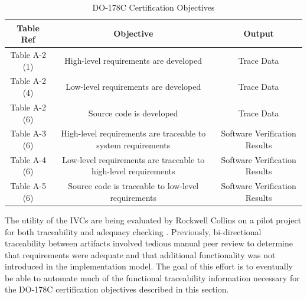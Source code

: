 \begin{table}
  \caption{DO-178C Certification Objectives}
  \centering
  \begin{tabular}{ |c|c|c| }
    \hline
     Table Ref & Objective & Output  \\[0.5ex]
    \hline\hline
    Table A-2 (1) & High-level requirements are developed & Trace Data \\
    Table A-2 (4) & Low-level requirements are developed & Trace Data \\
    Table A-2 (6) & Source code is developed & Trace Data \\
    Table A-3 (6) & High-level requirements are traceable to system requirements & Software Verification Results \\
    Table A-4 (6) & Low-level requirements are traceable to high-level requirements & Software Verification Results \\
    Table A-5 (6) & Source code is traceable to low-level requirements & Software Verification Results \\
    \hline
  \end{tabular}
  \label{tab:do178c}
\end{table}

The utility of the IVCs are being evaluated by Rockwell Collins on a pilot project for both traceability and adequacy checking \cite{lucas17}. Previously, bi-directional traceability between artifacts involved tedious manual peer review to determine that requirements were adequate and that additional functionality was not introduced in the implementation model. The goal of this effort is to eventually be able to automate much of the functional traceability information necessary for the DO-178C certification objectives described in this section.



